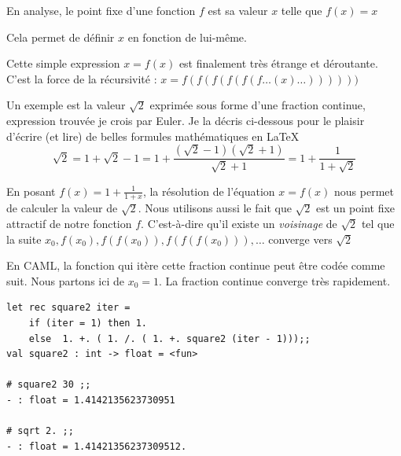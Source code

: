 \documentclass[11pt]{book}
\begin{document}
En analyse, le point fixe d'une fonction $f$ est sa valeur $x$ telle que $f(x)=x$

Cela permet de d\'{e}finir $x$ en fonction de lui-m\^{e}me.

Cette simple expression $x=f(x)$ est finalement tr\`{e}s \'{e}trange et d\'{e}routante.
C'est la force de la r\'{e}cursivit\'{e} : $x=f(f(f(f(f(f\ldots (x)\ldots))))))$

Un exemple est la valeur $\sqrt{2}$ exprim\'{e}e sous forme d'une fraction continue,
expression trouv\'{e}e je crois par Euler.
Je la d\'{e}cris ci-dessous  pour le plaisir d'\'{e}crire (et lire) de belles formules math\'{e}matiques en \LaTeX
\cite{lamport1994latex}
$$
\sqrt{2} = 1+\sqrt{2} -1
= 1+ \frac{(\sqrt{2} -1)(\sqrt{2} +1)}{\sqrt{2} +1}
= 1 + \frac{1}{1+\sqrt{2}}
$$





En posant $ f(x) = 1 + \frac{1}{1+x} $, la résolution de l'équation $x=f(x)$ nous permet
de calculer la valeur de $\sqrt{2}$. Nous utilisons aussi le fait que $\sqrt{2}$ est 
un point fixe attractif de notre fonction $f$. C'est-à-dire qu'il existe un \textit{voisinage} de 
$\sqrt{2}$ tel que la suite $ x_0,f(x_0),f(f(x_0)),f(f(f(x_0))),\dots $ converge vers $\sqrt{2}$


En CAML, la fonction qui it\`{e}re cette fraction continue peut être codée comme suit. 
Nous partons ici de $x_0 =1$. La fraction continue converge très rapidement.
\begin{Verbatim}
let rec square2 iter =
	if (iter = 1) then 1.
	else  1. +. ( 1. /. ( 1. +. square2 (iter - 1)));;
val square2 : int -> float = <fun>

# square2 30 ;;
- : float = 1.4142135623730951

# sqrt 2. ;;
- : float = 1.41421356237309512.

\end{Verbatim}
\end{document}
